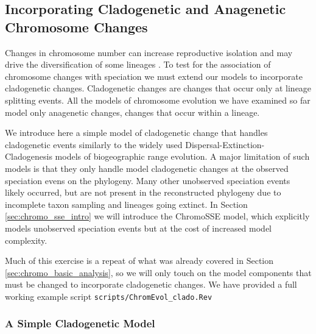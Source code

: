 \subsection{Incorporating Cladogenetic and Anagenetic Chromosome Changes}\label{subsect:clado_simple}

Changes in chromosome number can increase reproductive isolation and may drive the diversification
of some lineages \citep{stebbins1971chromosomal}. 
To test for the association
of chromosome changes with speciation we must extend our models to incorporate cladogenetic
changes. Cladogenetic changes are changes that occur only at lineage splitting events.
All the models of chromosome evolution we have examined so far model
only anagenetic changes, changes that occur within a lineage. 

We introduce here a simple model of cladogenetic change that handles cladogenetic events
similarly to the widely used Dispersal-Extinction-Cladogenesis \citep[DEC;][]{ree08} 
models of biogeographic range evolution.
A major limitation of such models is that they only handle model cladogenetic changes
at the observed speciation evens on the phylogeny.
Many other unobserved speciation events likely occurred, but are not present
in the reconstructed phylogeny due to incomplete taxon sampling and lineages
going extinct. In Section \ref{sec:chromo_sse_intro} we will introduce the
ChromoSSE model, which explicitly models unobserved speciation events but at the
cost of increased model complexity.

Much of this exercise is a repeat of what was already covered in Section \ref{sec:chromo_basic_analysis},
so we will only touch on the model components that must be changed to incorporate cladogenetic
changes.
We have provided a full working example script \texttt{scripts/ChromEvol\_clado.Rev}

\subsubsection{A Simple Cladogenetic Model}

